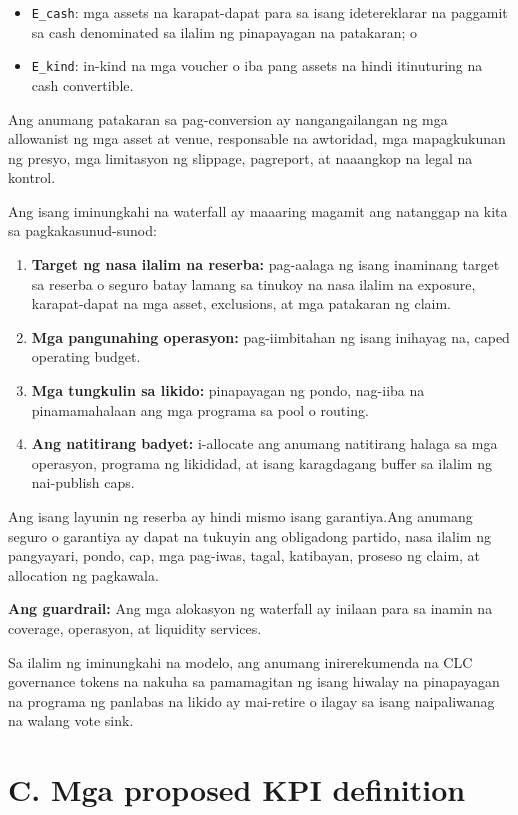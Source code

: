 \documentclass[11pt]{article}
\begin{document}
\begin{itemize}[leftmargin=*]
\item \texttt{E\_cash}: mga assets na karapat-dapat para sa isang idetereklarar na paggamit sa cash denominated sa ilalim ng pinapayagan na patakaran; o
\item \texttt{E\_kind}: in-kind na mga voucher o iba pang assets na hindi itinuturing na cash convertible.
\end{itemize}
Ang anumang patakaran sa pag-conversion ay nangangailangan ng mga allowanist ng mga asset at venue, responsable na awtoridad, mga mapagkukunan ng presyo, mga limitasyon ng slippage, pagreport, at naaangkop na legal na kontrol.

Ang isang iminungkahi na waterfall ay maaaring magamit ang natanggap na kita sa pagkakasunud-sunod:

\begin{enumerate}[leftmargin=*]
\item \textbf{Target ng nasa ilalim na reserba:} pag-aalaga ng isang inaminang target sa reserba o seguro batay lamang sa tinukoy na nasa ilalim na exposure, karapat-dapat na mga asset, exclusions, at mga patakaran ng claim.
\item \textbf{Mga pangunahing operasyon:} pag-iimbitahan ng isang inihayag na, caped operating budget.
\item \textbf{Mga tungkulin sa likido:} pinapayagan ng pondo, nag-iiba na pinamamahalaan ang mga programa sa pool o routing.
\item \textbf{Ang natitirang badyet:} i-allocate ang anumang natitirang halaga sa mga operasyon, programa ng likididad, at isang karagdagang buffer sa ilalim ng nai-publish caps.
\end{enumerate}
Ang isang layunin ng reserba ay hindi mismo isang garantiya.Ang anumang seguro o garantiya ay dapat na tukuyin ang obligadong partido, nasa ilalim ng pangyayari, pondo, cap, mga pag-iwas, tagal, katibayan, proseso ng claim, at allocation ng pagkawala.

\textbf{Ang guardrail:} Ang mga alokasyon ng waterfall ay inilaan para sa inamin na coverage, operasyon, at liquidity services.

Sa ilalim ng iminungkahi na modelo, ang anumang inirerekumenda na CLC governance tokens na nakuha sa pamamagitan ng isang hiwalay na pinapayagan na programa ng panlabas na likido ay mai-retire o ilagay sa isang naipaliwanag na walang vote sink.


\section*{C. Mga proposed KPI definition}
\end{document}
